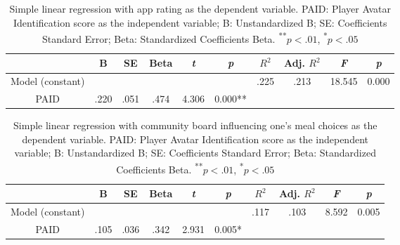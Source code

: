 \begin{table}
  \caption{Simple linear regression with app rating as the dependent variable. PAID: Player Avatar Identification score as the independent variable; B: Unstandardized B; SE: Coefficients Standard Error; Beta: Standardized Coefficients Beta.
  \textsuperscript{**}$p<.01$, 
  \textsuperscript{*}$p<.05$} 
  \label{tab:appenjoy}
 \begin{tabular}{cccccccccc}
    \toprule
    &B&SE&Beta&\textit{t}&\textit{p}&$R^{2}$&Adj. $R^{2}$&\textit{F}&\textit{p}\\ %
    \midrule                                  
     Model (constant)& &  & &  & &.225&.213&18.545&0.000\\
     PAID&.220 &.051  &.474 &4.306   &0.000**&&&&\\
    \bottomrule
 \end{tabular}
\end{table}








\begin{table}
  \caption{Simple linear regression with community board influencing one's meal choices as the dependent variable.
  PAID: Player Avatar Identification score as the independent variable; B: Unstandardized B; SE: Coefficients Standard Error; Beta: Standardized Coefficients Beta.
  \textsuperscript{**}$p<.01$, 
  \textsuperscript{*}$p<.05$} 
  \label{tab:comm_influ}
  \begin{tabular}{cccccccccc}
    \toprule
    &B&SE&Beta&\textit{t}&\textit{p}&$R^{2}$&Adj. $R^{2}$&\textit{F}&\textit{p}\\ %
    \midrule                                  
     Model (constant)& &  & &  & &.117&.103&8.592&0.005\\
     PAID&.105 &.036  &.342 &2.931   &0.005*&&&&\\
    \bottomrule
 \end{tabular}
\end{table}

